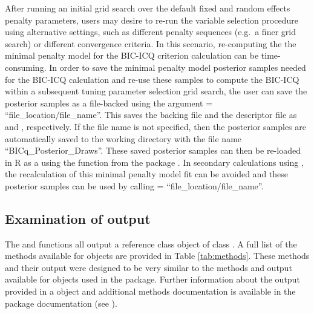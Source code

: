 
After running an initial grid search over the default fixed and random effects penalty parameters, users may desire to re-run the variable selection procedure using alternative settings, such as different penalty sequences (e.g.~a finer grid search) or different convergence criteria. In this scenario, re-computing the the minimal penalty model for the BIC-ICQ criterion calculation can be time-consuming. In order to save the minimal penalty model posterior samples
needed for the BIC-ICQ calculation and re-use these samples to compute the BIC-ICQ within a subsequent tuning parameter selection grid search, the user can save the posterior samples as a file-backed  using the argument  = ``file\_location/file\_name''.  This saves the backing file and the descriptor file as  and , respectively. If the
file name is not specified, then the posterior samples are
automatically saved to the working directory with the file name ``BICq\_Posterior\_Draws''. These saved posterior samples can then be re-loaded in R as a  using the  function from the package
 \citep{bigmemory2013}. In secondary calculations using , the recalculation of this minimal penalty model fit can be avoided and these posterior samples can be used by calling
 = ``file\_location/file\_name''.




\subsection{Examination of output}
\label{sec:exam-output}

The  and  functions all output a reference class object of class . A full list of the methods available for  objects are provided in Table \ref{tab:methods}. These methods and their output were designed to be very similar to the methods and output available for  objects used in the  package. Further information about the output provided in a  object and additional methods documentation is available in the  package documentation (see ).

